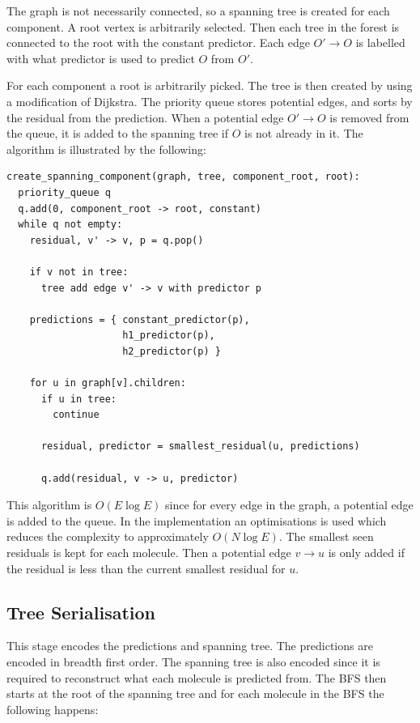 \documentclass{report}
\begin{document}
The graph is not necessarily connected, so a spanning tree is created for each
component. A root vertex is arbitrarily selected. Then each tree in the forest
is connected to the root with the constant predictor. Each edge $O' \to O$ is
labelled with what predictor is used to predict $O$ from $O'$.

For each component a root is arbitrarily picked. The tree is then created by
using a modification of Dijkstra. The priority queue stores potential edges,
and sorts by the residual from the prediction. When a potential edge $O' \to
O$ is removed from the queue, it is added to the spanning tree if $O$ is not
already in it. The algorithm is illustrated by the following:

\begin{verbatim}
create_spanning_component(graph, tree, component_root, root):
  priority_queue q
  q.add(0, component_root -> root, constant)
  while q not empty:
    residual, v' -> v, p = q.pop()

    if v not in tree:
      tree add edge v' -> v with predictor p

    predictions = { constant_predictor(p),
                    h1_predictor(p),
                    h2_predictor(p) }

    for u in graph[v].children:
      if u in tree:
        continue

      residual, predictor = smallest_residual(u, predictions)

      q.add(residual, v -> u, predictor)
\end{verbatim}

This algorithm is $O(E \log E)$ since for every edge in the graph, a potential
edge is added to the queue. In the implementation an optimisations is used
which reduces the complexity to approximately $O(N \log E)$. The smallest seen
residuals is kept for each molecule. Then a potential edge $v \to u$ is only
added if the residual is less than the current smallest residual for $u$.


\subsection{Tree Serialisation}

This stage encodes the predictions and spanning tree. The predictions are
encoded in breadth first order. The spanning tree is also encoded since it is
required to reconstruct what each molecule is predicted from. The BFS then
starts at the root of the spanning tree and for each molecule in the BFS the
following happens:
\end{document}

